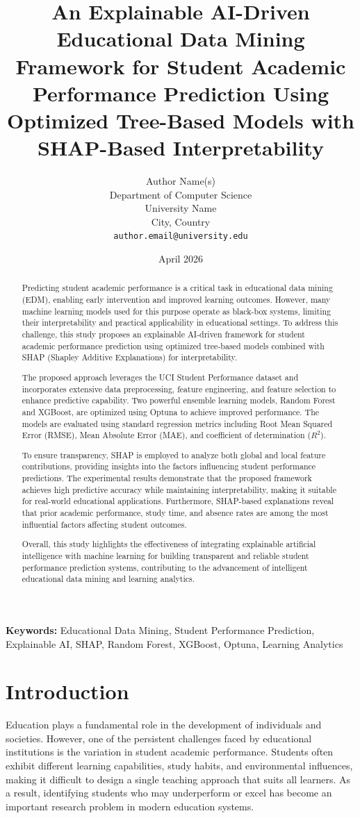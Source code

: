 \documentclass[12pt,a4paper]{article}
\title{\textbf{An Explainable AI-Driven Educational Data Mining Framework for Student Academic Performance Prediction Using Optimized Tree-Based Models with SHAP-Based Interpretability}}
\author{
Author Name(s) \\
Department of Computer Science \\
University Name \\
City, Country \\
\texttt{author.email@university.edu}
}
\date{April 2026}
\begin{document}
\maketitle

\begin{abstract}
Predicting student academic performance is a critical task in educational data mining (EDM), enabling early intervention and improved learning outcomes. However, many machine learning models used for this purpose operate as black-box systems, limiting their interpretability and practical applicability in educational settings. To address this challenge, this study proposes an explainable AI-driven framework for student academic performance prediction using optimized tree-based models combined with SHAP (Shapley Additive Explanations) for interpretability.

The proposed approach leverages the UCI Student Performance dataset and incorporates extensive data preprocessing, feature engineering, and feature selection to enhance predictive capability. Two powerful ensemble learning models, Random Forest and XGBoost, are optimized using Optuna to achieve improved performance. The models are evaluated using standard regression metrics including Root Mean Squared Error (RMSE), Mean Absolute Error (MAE), and coefficient of determination ($R^2$).

To ensure transparency, SHAP is employed to analyze both global and local feature contributions, providing insights into the factors influencing student performance predictions. The experimental results demonstrate that the proposed framework achieves high predictive accuracy while maintaining interpretability, making it suitable for real-world educational applications. Furthermore, SHAP-based explanations reveal that prior academic performance, study time, and absence rates are among the most influential factors affecting student outcomes.

Overall, this study highlights the effectiveness of integrating explainable artificial intelligence with machine learning for building transparent and reliable student performance prediction systems, contributing to the advancement of intelligent educational data mining and learning analytics.
\end{abstract}

\textbf{Keywords:} Educational Data Mining, Student Performance Prediction, Explainable AI, SHAP, Random Forest, XGBoost, Optuna, Learning Analytics

\section{Introduction}
Education plays a fundamental role in the development of individuals and societies. However, one of the persistent challenges faced by educational institutions is the variation in student academic performance. Students often exhibit different learning capabilities, study habits, and environmental influences, making it difficult to design a single teaching approach that suits all learners. As a result, identifying students who may underperform or excel has become an important research problem in modern education systems.
\end{document}
